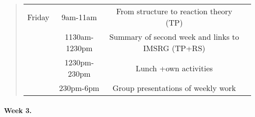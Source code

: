 \documentclass[%
oneside,                 %
final,                   %
10pt]{article}
\begin{document}
\begin{quote}
\begin{tabular}{cccc}
\hline
Friday    & 9am-11am      & From structure to reaction theory (TP)            &                                               \\
          & 1130am-1230pm & Summary of second week and links to IMSRG (TP+RS) &                                               \\
          & 1230pm-230pm  & Lunch +own activities                             &                                               \\
          & 230pm-6pm     & Group presentations of weekly work                &                                               \\
\hline
\end{tabular}
\end{quote}

\noindent


\paragraph{Week 3.}
\end{document}
